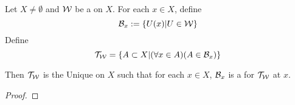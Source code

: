 \begin{prop}
    \label{prop:UniformTopology}
    Let $X  \neq \emptyset$ 
    and $\mathcal{W}$ be a \Uniformity on $X$. 
    For each $x \in X$, define 
    \begin{equation*}
    \mathcal{B}_x:= \{U(x) | U \in \mathcal{W} \}
    \end{equation*}
    Define 
    \begin{equation}
        \mathcal{T}_{\mathcal{W}}= \{A \subset X | (\forall x \in A)(A \in \mathcal{B}_x)\}
    \end{equation}

    Then $\mathcal{T}_{\mathcal{W}}$ is the Unique \Topology on $X$ such that 
    for each $x \in X$, $\mathcal{B}_x$ is a \NeighborhoodFilter
    for $\mathcal{T}_{\mathcal{W}}$ at $x$. 
    \begin{proof}
    \end{proof}
\end{prop}

